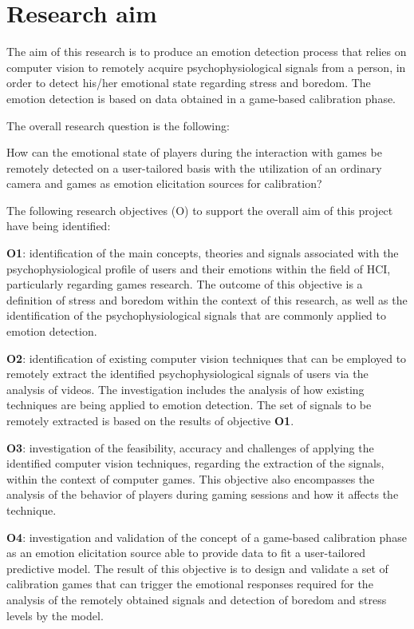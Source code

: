 \section{Research aim}
\label{sec:research-aim}

The aim of this research is to produce an emotion detection process that relies on computer vision to remotely acquire psychophysiological signals from a person, in order to detect his/her emotional state regarding stress and boredom. The emotion detection is based on data obtained in a game-based calibration phase.

The overall research question is the following:

\begin{fquote}
How can the emotional state of players during the interaction with games be remotely detected on a user-tailored basis with the utilization of an ordinary camera and games as emotion elicitation sources for calibration?
\end{fquote}

The following research objectives (O) to support the overall aim of this project have being identified:

\textbf{O1}: identification of the main concepts, theories and signals associated with the psychophysiological profile of users and their emotions within the field of HCI, particularly regarding games research. The outcome of this objective is a definition of stress and boredom within the context of this research, as well as the identification of the psychophysiological signals that are commonly applied to emotion detection.

\textbf{O2}: identification of existing computer vision techniques that can be employed to remotely extract the identified psychophysiological signals of users via the analysis of videos. The investigation includes the analysis of how existing techniques are being applied to emotion detection. The set of signals to be remotely extracted is based on the results of objective \textbf{O1}.

\textbf{O3}: investigation of the feasibility, accuracy and challenges of applying the identified computer vision techniques, regarding the extraction of the signals, within the context of computer games. This objective also encompasses the analysis of the behavior of players during gaming sessions and how it affects the technique.

\textbf{O4}: investigation and validation of the concept of a game-based calibration phase as an emotion elicitation source able to provide data to fit a user-tailored predictive model. The result of this objective is to design and validate a set of calibration games that can trigger the emotional responses required for the analysis of the remotely obtained signals and detection of boredom and stress levels by the model.

